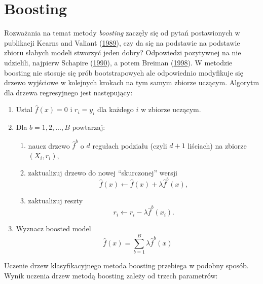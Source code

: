 \documentclass[
]{book}
\providecommand{\tightlist}{%
  \setlength{\itemsep}{0pt}\setlength{\parskip}{0pt}}
\theoremstyle{plain}
\theoremstyle{definition}
\theoremstyle{definition}
\theoremstyle{definition}
\theoremstyle{definition}
\theoremstyle{remark}
\begin{document}
\hypertarget{boosting}{%
\section{Boosting}\label{boosting}}

Rozważania na temat metody \emph{boosting} zaczęły się od pytań postawionych w publikacji Kearns and Valiant (\protect\hyperlink{ref-kearns1989}{1989}), czy da się na podstawie na podstawie zbioru słabych modeli stworzyć jeden dobry? Odpowiedzi pozytywnej na nie udzielili, najpierw Schapire (\protect\hyperlink{ref-schapire1990}{1990}), a potem Breiman (\protect\hyperlink{ref-breiman1998}{1998}). W metodzie boosting nie stosuje się prób bootstrapowych ale odpowiednio modyfikuje się drzewo wyjściowe w kolejnych krokach na tym samym zbiorze uczącym. Algorytm dla drzewa regresyjnego jest następujący:

\begin{enumerate}
\def\labelenumi{\arabic{enumi}.}
\tightlist
\item
  Ustal \(\hat{f}(x)=0\) i \(r_i=y_i\) dla każdego \(i\) w zbiorze uczącym.
\item
  Dla \(b=1,2,\ldots, B\) powtarzaj:

  \begin{enumerate}
  \def\labelenumii{\alph{enumii})}
  \tightlist
  \item
    naucz drzewo \(\hat{f}^b\) o \(d\) regułach podziału (czyli \(d+1\) liściach) na zbiorze \((X_i, r_i)\),
  \item
    zaktualizuj drzewo do nowej ``skurczonej'' wersji
    \begin{equation}
     \hat{f}(x)\leftarrow \hat{f}(x)+\lambda\hat{f}^b(x),
    \end{equation}
  \item
    zaktualizuj reszty
    \begin{equation}
     r_i\leftarrow r_i-\lambda\hat{f}^b(x_i).
    \end{equation}
  \end{enumerate}
\item
  Wyznacz boosted model
  \begin{equation}
    \hat{f}(x) = \sum_{b=1}^B\lambda\hat{f}^b(x)
  \end{equation}
\end{enumerate}

Uczenie drzew klasyfikacyjnego metoda boosting przebiega w podobny sposób. Wynik uczenia drzew metodą boosting zależy od trzech parametrów:
\end{document}

